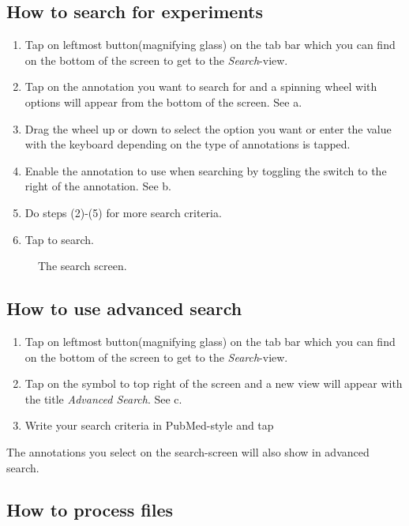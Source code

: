 \subsection{How to search for experiments}

\begin{enumerate}
\item Tap on leftmost button(magnifying glass) on the tab bar which you can find on the bottom of the screen to get to the \emph{Search}-view.
\item Tap on the annotation you want to search for and a spinning wheel with options will appear from the bottom of the screen. See a.
\item Drag the wheel up or down to select the option you want or enter the value with the keyboard depending on the type of annotations is tapped.
\item Enable the annotation to use when searching by toggling the switch to the right of the annotation. See b.
\item Do steps (2)-(5) for more search criteria.
\item Tap  to search.
\end{enumerate}

\begin{figure}[ht]
\caption{The search screen.}
\label{fig:ios_search}
\end{figure}
\FloatBarrier

\subsection{How to use advanced search}

\begin{enumerate}
\item Tap on leftmost button(magnifying glass) on the tab bar which you can find on the bottom of the screen to get to the \emph{Search}-view.
\item Tap on the symbol to top right of the screen and a new view will appear with the title \emph{Advanced Search}. See c.
\item Write your search criteria in PubMed-style and tap 
\end{enumerate}
The annotations you select on the search-screen will also show in advanced search.

\subsection{How to process files}


